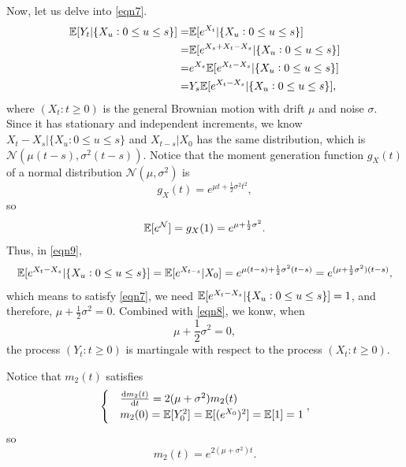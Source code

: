 \begin{enumerate}
        Now, let us delve into \eqref{eqn7}.
        \begin{align}
            \mathbb{E} [Y_t | \{X_u: 0 \le u \le s\}] = & \mathbb{E} [e^{X_t} | \{X_u: 0 \le u \le s\}] \notag \\ 
            = & \mathbb{E} [e^{X_s + X_t - X_s} |  \{X_u: 0 \le u \le s\}] \notag \\ 
            = & e^{X_s} \mathbb{E} [e^{X_t - X_s} |  \{X_u: 0 \le u \le s\}] \notag \\ 
            = & Y_s \mathbb{E} [e^{X_t - X_s} |  \{X_u: 0 \le u \le s\}], \label{eqn9}
        \end{align}
        where $(X_t: t \ge 0)$ is the general Brownian motion with drift $\mu$ and noise $\sigma$. Since it has stationary and independent increments, we know ${X_t - X_s} |  \{X_u: 0 \le u \le s\}$ and $X_{t-s} | X_0$ has the same distribution, which is $\mathcal{N}(\mu(t-s), \sigma^2(t-s))$. Notice that the moment generation function $g_X(t)$ of a normal distribution $\mathcal{N}(\mu, \sigma^2)$ is 
        \begin{equation*}
            g_X(t) = e^{\mu t + \frac{1}{2}\sigma^2 t^2},
        \end{equation*}
        so 
        \begin{equation*}
            \mathbb{E} [e^\mathcal{N}] = g_X(1) =  e^{\mu + \frac{1}{2} \sigma^2}.
        \end{equation*}
        Thus, in \eqref{eqn9},
        \begin{equation*}
            \mathbb{E}[e^{X_t - X_s} | \{X_u: 0 \le u \le s\}] = \mathbb{E} [e^{X_{t-s}} | X_0] = e^{\mu (t-s) + \frac{1}{2} \sigma^2 (t-s)} = e^{(\mu + \frac{1}{2} \sigma^2) (t-s)},
        \end{equation*}
        which means to satisfy \eqref{eqn7}, we need $\mathbb{E}[e^{X_t - X_s} | \{X_u: 0 \le u \le s\}]  = 1$, and therefore, $\mu + \frac{1}{2} \sigma^2 = 0$. Combined with \eqref{eqn8}, we konw, when 
        \begin{equation*}
            \mu + \frac{1}{2}\sigma^2 = 0,
        \end{equation*}
        the process $(Y_t: t \ge 0)$ is martingale with respect to the process $(X_t: t \ge 0)$.

        Notice that $m_2(t)$ satisfies
        \begin{equation*}
            \begin{cases}
                & \frac{\dif m_2(t)}{\dif t} = 2(\mu + \sigma^2) m_2(t) \\ 
                & m_2(0) = \E[Y_0^2] = \E [(e^{X_0})^2] = \E [1] = 1
            \end{cases},
        \end{equation*}
        so 
        \begin{equation*}
            m_2(t) = e^{2(\mu + \sigma^2)t}.
        \end{equation*}


\end{enumerate}
